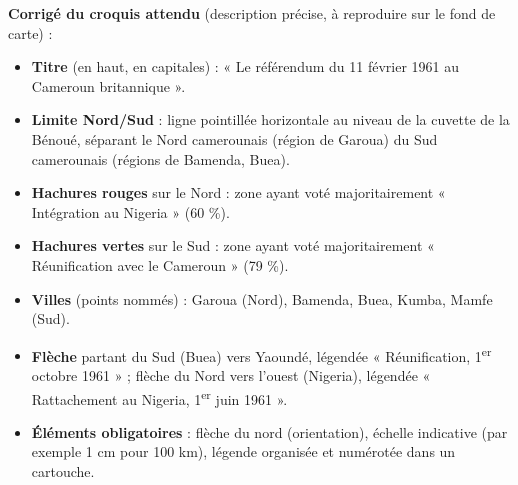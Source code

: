 \documentclass[11pt]{article}
\begin{document}
\begin{corrige}
\textbf{Corrigé du croquis attendu} (description précise, à reproduire sur le fond de carte) :
\begin{itemize}
\item \textbf{Titre} (en haut, en capitales) : « Le référendum du 11 février 1961 au Cameroun britannique ».
\item \textbf{Limite Nord/Sud} : ligne pointillée horizontale au niveau de la cuvette de la Bénoué, séparant le Nord camerounais (région de Garoua) du Sud camerounais (régions de Bamenda, Buea).
\item \textbf{Hachures rouges} sur le Nord : zone ayant voté majoritairement « Intégration au Nigeria » (60 \%).
\item \textbf{Hachures vertes} sur le Sud : zone ayant voté majoritairement « Réunification avec le Cameroun » (79 \%).
\item \textbf{Villes} (points nommés) : Garoua (Nord), Bamenda, Buea, Kumba, Mamfe (Sud).
\item \textbf{Flèche} partant du Sud (Buea) vers Yaoundé, légendée « Réunification, 1\textsuperscript{er} octobre 1961 » ; flèche du Nord vers l'ouest (Nigeria), légendée « Rattachement au Nigeria, 1\textsuperscript{er} juin 1961 ».
\item \textbf{Éléments obligatoires} : flèche du nord (orientation), échelle indicative (par exemple 1 cm pour 100 km), légende organisée et numérotée dans un cartouche.
\end{itemize}


\end{corrige}
\end{document}
